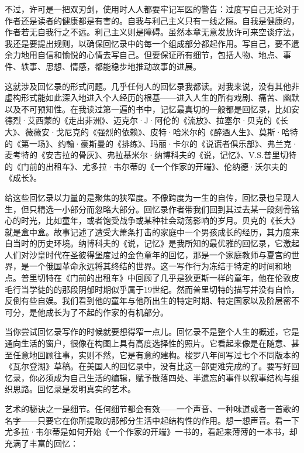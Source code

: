 不过，许可是一把双刃剑，使用时人人都要牢记军医的警告：过度写自己无论对于作者还是读者的健康都是有害的。自我与利己主义只有一线之隔。自我是健康的，作者若无自我行之不远。利己主义则是障碍。虽然本章无意发放许可来空谈疗法，我还是要提出规则，以确保回忆录中的每一个组成部分都起作用。写自己，要不遗余力地用自信和愉悦的心情去写自己。但要保证所有细节，包括人物、地点、事件、轶事、思想、情感，都能稳步地推动故事的进展。

这就涉及回忆录的形式问题。几乎任何人的回忆录我都读。对我来说，没有其他非虚构形式能如此深入地进入个人经历的根基——进入人生的所有戏剧、痛苦、幽默以及不可预知性。在我读过第一遍的书中，记忆最真切的一般都是回忆录，比如安德烈·艾西蒙的《走出非洲》、迈克尔·J·阿伦的《流放》、拉塞尔·贝克的《长大》、薇薇安·戈尼克的《强烈的依赖》、皮特·哈米尔的《醉酒人生》、莫斯·哈特的《第一场》、约翰·豪斯曼的《排练》、玛丽·卡尔的《说谎者俱乐部》、弗兰克·麦考特的《安吉拉的骨灰》、弗拉基米尔·纳博科夫的《说，记忆》、V.S.普里切特的《门前的出租车》、尤多拉·韦尔蒂的《一个作家的开端》、伦纳德·沃尔夫的《成长》。

给这些回忆录以力量的是聚焦的狭窄度。不像跨度为一生的自传，回忆录也呈现人生，但只精选一小部分而忽略大部分。回忆录作者带我们回到其过去某一段刻骨铭心的时光，比如童年，或者饱受战争或某种社会动荡影响的岁月。贝克的《长大》就是盒中盒。故事记述了遭受大萧条打击的家庭中一个男孩成长的经历，其力度来自当时的历史环境。纳博科夫的《说，记忆》是我所知的最优雅的回忆录，它激起人们对沙皇时代在圣彼得堡度过的金色童年的回忆，那是一个家庭教师与夏宫的世界，是一个俄国革命永远将其终结的世界。这一写作行为冻结于特定的时间和地点。普里切特在《门前的出租车》中回顾了几乎是狄更斯一样的童年，他在伦敦皮毛行当学徒的的那段阴郁时期似乎属于19世纪。然而普里切特的描写并没有自怜，反倒有些自娱。我们看到他的童年与他所出生的特定时期、特定国家以及阶层密不可分，是他成长为了不起的作家的有机部分。

当你尝试回忆录写作的时候就要想得窄一点儿。回忆录不是整个人生的概述，它是通向生活的窗户，很像在构图上具有高度选择性的照片。它看起来像是在随意、甚至任意地回顾往事，实则不然，它是有意的建构。梭罗八年间写过七个不同版本的《瓦尔登湖》草稿。在美国人的回忆录中，没有比这一部更难完成的了。要写好回忆录，你必须成为自己生活的编辑，赋予散落四处、半遗忘的事件以叙事结构与组织思路。回忆录是发明真实的艺术。

艺术的秘诀之一是细节。任何细节都会有效——一个声音、一种味道或者一首歌的名字——只要它在你所提取的那部分生活中起结构性的作用。想一想声音。看一下尤多拉·韦尔蒂是如何开始《一个作家的开端》一书的，看起来薄薄的一本书，却充满了丰富的回忆：

